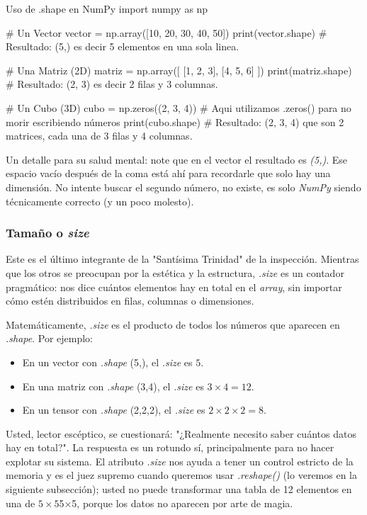 \begin{pycode}{Uso de .shape en NumPy}
import numpy as np

# Un Vector
vector = np.array([10, 20, 30, 40, 50])
print(vector.shape) # Resultado: (5,) es decir 5 elementos en una sola linea. 

# Una Matriz (2D)
matriz = np.array([
    [1, 2, 3],
    [4, 5, 6]
    ])
print(matriz.shape) # Resultado: (2, 3) es decir  2 filas y 3 columnas.

# Un Cubo (3D)
cubo = np.zeros((2, 3, 4)) # Aqui utilizamos .zeros() para no morir escribiendo números
print(cubo.shape) # Resultado: (2, 3, 4) que son 2 matrices, cada una de 3 filas y 4 columnas.

\end{pycode}

Un detalle para su salud mental: note que en el vector el resultado es \textit{(5,)}. Ese espacio vacío después de la coma está ahí para recordarle que solo hay una dimensión. No intente buscar el segundo número, no existe, es solo \textit{NumPy} siendo técnicamente correcto (y un poco molesto).



\subsubsection{Tamaño o \textit{size}}

Este es el último integrante de la "Santísima Trinidad" de la inspección. Mientras que los otros se preocupan por la estética y la estructura, \textit{.size} es un contador pragmático: nos dice cuántos elementos hay en total en el \textit{array}, sin importar cómo estén distribuidos en filas, columnas o dimensiones.

Matemáticamente, \textit{.size} es el producto de todos los números que aparecen en \textit{.shape}. Por ejemplo:

\begin{itemize}
\item En un vector con \textit{.shape} (5,), el \textit{.size} es \(5\).
\item En una matriz con \textit{.shape} (3,4), el \textit{.size} es \(3 \times 4 = 12\).
\item En un tensor con \textit{.shape} (2,2,2), el \textit{.size} es \(2 \times 2 \times 2 = 8\).
\end{itemize}

Usted, lector escéptico, se cuestionará: "¿Realmente necesito saber cuántos datos hay en total?". La respuesta es un rotundo sí, principalmente para no hacer explotar su sistema. El atributo \textit{.size} nos ayuda a tener un control estricto de la memoria y es el juez supremo cuando queremos usar \textit{.reshape()} (lo veremos en la siguiente subsección); usted no puede transformar una tabla de 12 elementos en una de \(5 \times 5\)5×5, porque los datos no aparecen por arte de magia.

